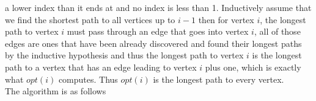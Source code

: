 \documentclass{amsart}
\begin{document}
a lower index than it ends at and no index is less than 1.
Inductively assume that we find the shortest path to all vertices up to $i-1$ then for vertex $i$, the longest path to vertex $i$ must pass
through an edge that goes into vertex $i$, all of those edges are ones that have been already discovered and found their longest paths by the inductive hypothesis
and thus the longest path to vertex $i$ is the longest path to a vertex that has an edge leading to vertex  $i$ plus one, which is exactly what $opt(i)$ computes. Thus $opt(i)$ is
the longest path to every vertex.
\\
The algorithm is as follows
\begin{lstlisting}
\end{lstlisting}
\end{document}
